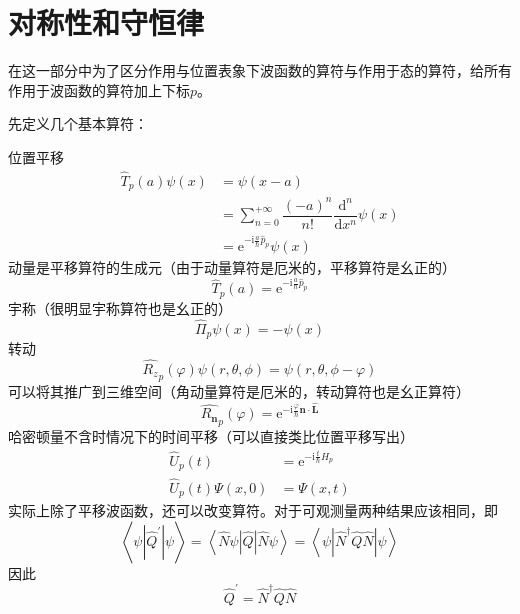 \documentclass[12pt, a4paper, oneside]{ctexart}
\begin{document}
	\section{对称性和守恒律}
	在这一部分中为了区分作用与位置表象下波函数的算符与作用于态的算符，给所有作用于波函数的算符加上下标$p$。\par 
	先定义几个基本算符：\par
	位置平移
	\begin{align}
		\hat{T}_{p}(a)\psi(x)&=\psi(x-a)\\
		&=\sum_{n=0}^{+\infty}\dfrac{(-a)^{n}}{n!}\dfrac{\mathrm{d}^{n}}{\mathrm{d}x^{n}}\psi(x)\\
		&=\mathrm{e}^{-\mathrm{i}\frac{a}{\hbar}\hat{p}_{p}}\psi(x)
	\end{align}
	\quad\quad 动量是平移算符的生成元（由于动量算符是厄米的，平移算符是幺正的）
	\begin{equation}
		\hat{T}_{p}(a)=\mathrm{e}^{-\mathrm{i}\frac{a}{\hbar}\hat{p}_{p}}
	\end{equation}
	\quad\quad 宇称（很明显宇称算符也是幺正的）
	\begin{equation}
		\hat{\Pi}_{p}\psi(x)=-\psi(x)
	\end{equation}
	\quad\quad 转动
	\begin{equation}
		\hat{R_{z}}_{p}(\varphi)\psi(r,\theta,\phi)=\psi(r,\theta,\phi-\varphi)
	\end{equation}
	\quad\quad 可以将其推广到三维空间（角动量算符是厄米的，转动算符也是幺正算符）
	\begin{equation}
		\hat{R_{\boldsymbol{n}}}_{p}(\varphi)=\mathrm{e}^{-\mathrm{i}\frac{\varphi}{\hbar}\boldsymbol{n}\cdot\boldsymbol{\hat{L}}}
	\end{equation}
	\quad\quad 哈密顿量不含时情况下的时间平移（可以直接类比位置平移写出）
	\begin{align}
		\hat{U}_{p}(t)&=\mathrm{e}^{-\mathrm{i}\frac{t}{\hbar}\hat{H}_{p}}\\
		\hat{U}_{p}(t)\Psi(x,0)&=\Psi(x,t)
	\end{align}
	\quad\quad 实际上除了平移波函数，还可以改变算符。对于可观测量两种结果应该相同，即
	\begin{equation}
		\left<\psi\left|\hat{Q}^{\prime}\right|\psi\right>=\left<\hat{N}\psi\left|\hat{Q}\right|\hat{N}\psi\right>=\left<\psi\left|\hat{N}^{\dagger}\hat{Q}\hat{N}\right|\psi\right>
	\end{equation}
	\quad\quad 因此
	\begin{equation}
		\hat{Q}^{\prime}=\hat{N}^{\dagger}\hat{Q}\hat{N}
	\end{equation}
\end{document}
